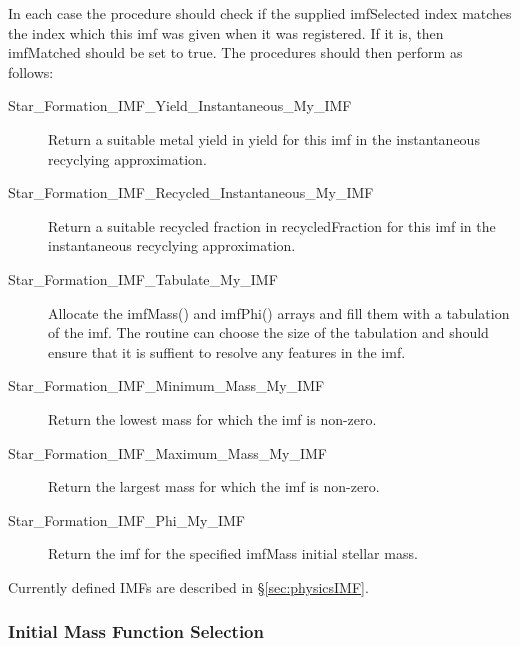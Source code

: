 In each case the procedure should check if the supplied {\normalfont \ttfamily imfSelected} index matches the index which this \gls{imf} was given when it was registered. If it is, then {\normalfont \ttfamily imfMatched} should be set to true. The procedures should then perform as follows:
\begin{description}
 \item [{\normalfont \ttfamily Star\_Formation\_IMF\_Yield\_Instantaneous\_My\_IMF}] Return a suitable metal yield in {\normalfont \ttfamily yield} for this \gls{imf} in the instantaneous recyclying approximation.
 \item [{\normalfont \ttfamily Star\_Formation\_IMF\_Recycled\_Instantaneous\_My\_IMF}] Return a suitable recycled fraction in {\normalfont \ttfamily recycledFraction} for this \gls{imf} in the instantaneous recyclying approximation.
 \item [{\normalfont \ttfamily Star\_Formation\_IMF\_Tabulate\_My\_IMF}] Allocate the {\normalfont \ttfamily imfMass()} and {\normalfont \ttfamily imfPhi()} arrays and fill them with a tabulation of the \gls{imf}. The routine can choose the size of the tabulation and should ensure that it is suffient to resolve any features in the \gls{imf}.
 \item [{\normalfont \ttfamily Star\_Formation\_IMF\_Minimum\_Mass\_My\_IMF}] Return the lowest mass for which the \gls{imf} is non-zero.
 \item [{\normalfont \ttfamily Star\_Formation\_IMF\_Maximum\_Mass\_My\_IMF}] Return the largest mass for which the \gls{imf} is non-zero.
 \item [{\normalfont \ttfamily Star\_Formation\_IMF\_Phi\_My\_IMF}] Return the \gls{imf} for the specified {\normalfont \ttfamily imfMass} initial stellar mass.
\end{description}
Currently defined IMFs are described in \S\ref{sec:physicsIMF}.

\subsubsection{Initial Mass Function Selection}

